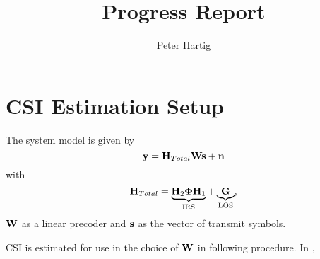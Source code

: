 \documentclass[12pt,a4paper]{report}
\title{Progress Report}
\author{Peter Hartig}
\begin{document}
\maketitle
\tableofcontents

\section{CSI Estimation Setup}
The system model is given by 
\begin{equation}
\mathbf{y} = \mathbf{H}_{Total} \mathbf{W} \mathbf{s}  + \mathbf{n}
\end{equation}
with 
	\begin{equation*}
	\mathbf{H}_{Total} = \underbrace{\mathbf{H}_{2}\boldsymbol{\Phi}\mathbf{H}_{1}}_{\text{IRS}} + \underbrace{\mathbf{G}}_{\text{LOS}},
	\end{equation*}
	$\mathbf{W}$ as a linear precoder and $\mathbf{s}$ as the vector of transmit symbols.
	\par
	CSI is estimated for use in the choice of $\mathbf{W}$ in following procedure. 
	In  , 
\end{document}
